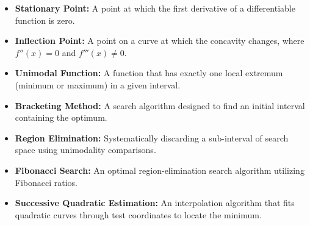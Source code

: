 \documentclass[12pt,a4paper]{article}
\begin{document}
\begin{tcolorbox}[defbox, title={\textbf{One-Line Definitions}}]
\begin{itemize}[leftmargin=*, itemsep=2.5pt, topsep=0pt]
  \item \textbf{Stationary Point:} A point at which the first derivative of a differentiable function is zero.
  \item \textbf{Inflection Point:} A point on a curve at which the concavity changes, where $f''(x)=0$ and $f'''(x) \neq 0$.
  \item \textbf{Unimodal Function:} A function that has exactly one local extremum (minimum or maximum) in a given interval.
  \item \textbf{Bracketing Method:} A search algorithm designed to find an initial interval containing the optimum.
  \item \textbf{Region Elimination:} Systematically discarding a sub-interval of search space using unimodality comparisons.
  \item \textbf{Fibonacci Search:} An optimal region-elimination search algorithm utilizing Fibonacci ratios.
  \item \textbf{Successive Quadratic Estimation:} An interpolation algorithm that fits quadratic curves through test coordinates to locate the minimum.
\end{itemize}
\end{tcolorbox}
\end{document}
